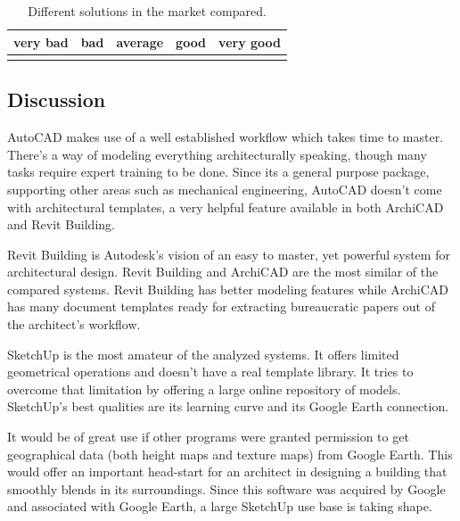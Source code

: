 \vspace{-0.5cm}
\begin{table}[!ht]
  \centering
	\begin{tabular}{|p{1.1cm}|p{1.1cm}|p{1.1cm}|p{1.1cm}|p{1.1cm}|}
		\hline
		\scriptsize{very bad}	& \scriptsize{bad}			& \scriptsize{average}	& \scriptsize{good}		& \scriptsize{very good}	\\
		\hline
		\GdE									&	\GdD									&	\GdC									&	\GdB								&	\GdA			\\
		\hline
	\end{tabular}
  \caption{Different solutions in the market compared.}
  \label{TB-COMP-SOL}
\end{table}

\subsection{Discussion}
AutoCAD makes use of a well established workflow which takes time to master.
There's a way of modeling everything architecturally speaking, though many
tasks require expert training to be done.
Since its a general purpose package, supporting other areas such as mechanical engineering,
AutoCAD doesn't come with architectural templates,
a very helpful feature available in both ArchiCAD and Revit Building.

Revit Building is Autodesk's vision of an easy to master,
yet powerful system for architectural design.
Revit Building and ArchiCAD are the most similar of the compared systems.
Revit Building has better modeling features while ArchiCAD has many document templates
ready for extracting bureaucratic papers out of the architect's workflow.

SketchUp is the most amateur of the analyzed systems.
It offers limited geometrical operations and doesn't have a real template library.
It tries to overcome that limitation by offering a large online repository of models.
SketchUp's best qualities are its learning curve and its Google Earth connection.

It would be of great use if other programs were granted permission to get geographical
data (both height maps and texture maps) from Google Earth.
This would offer an important head-start for an architect in designing a building that
smoothly blends in its surroundings.
Since this software was acquired by Google and associated with Google Earth,
a large SketchUp use base is taking shape.